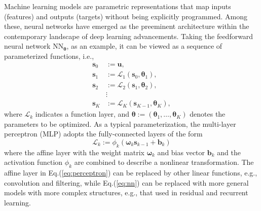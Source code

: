 \documentclass[preprint,3p,12pt,sort&compress]{elsarticle}
\begin{document}
Machine learning models are parametric representations that map inputs (features) and outputs (targets) without being explicitly programmed.
Among these, neural networks have emerged as the preeminent architecture within the contemporary landscape of deep learning advancements.
Taking the feedforward neural network $\mathrm{NN}_{\boldsymbol\theta}$, as an example, it can be viewed as a sequence of parameterized functions, i.e.,
\begin{equation}
\begin{aligned}
    \mathbf s_0 & :=\mathbf{u},\\
    \mathbf s_1 & :=\mathcal L_1\left(\mathbf s_0, \boldsymbol{\theta}_1\right), \\
    \mathbf s_2 & :=\mathcal L_2\left(\mathbf s_1, \boldsymbol{\theta}_2\right), \\
    & \vdots \\
    \mathbf {s}_K & :=\mathcal L_K\left(\mathbf{s}_{K-1}, \boldsymbol{\theta}_K\right),
\end{aligned}
\label{eq:nn}
\end{equation}
where $\mathcal L_k$ indicates a function layer, and $\boldsymbol{\theta}:=(\boldsymbol\theta_1,\dots,\boldsymbol\theta_K)$ denotes the parameters to be optimized.
As a typical parameterization, the multi-layer perceptron (MLP) adopts the fully-connected layers of the form
\begin{equation}
    \mathcal L_k := \phi_k (\boldsymbol \omega_k \mathbf s_{k-1} + \mathbf b_k)
\label{eq:perceptron}
\end{equation}
where the affine layer with the weight matrix $\boldsymbol{\omega}_k$ and bias vector $\mathbf b_k$ and the activation function $\phi_k$ are combined to describe a
nonlinear transformation.
The affine layer in Eq.(\ref{eq:perceptron}) can be replaced by other linear functions, e.g., convolution and filtering, while Eq.(\ref{eq:nn}) can be replaced with more general models with more complex structures, e.g., that used in residual and recurrent learning.
\end{document}
